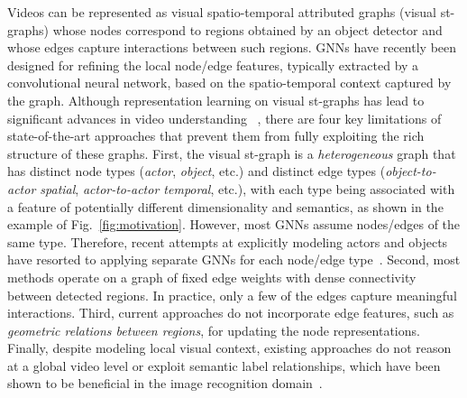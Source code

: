 \documentclass[runningheads]{llncs}
\begin{document}
Videos can be represented as visual spatio-temporal attributed graphs (visual 
st-graphs) whose nodes correspond to regions obtained by an object detector
and whose edges capture interactions between such regions. GNNs have recently 
been designed for refining the local node/edge features, typically extracted 
by a convolutional neural network, based on the spatio-temporal context 
captured by the graph. Although representation learning on visual st-graphs 
has lead to significant advances in video understanding~
\cite{Zhang:CVPR19,Sun:ECCV18,Girdhar:CVPR19,Wang:ECCV18,Huang:BMVC19,Yuan:ICCV17,Baradel:ECCV18}, 
there are four key limitations of state-of-the-art approaches that prevent 
them from fully exploiting the rich structure of these graphs.
First, the visual st-graph is a \emph{heterogeneous} graph that has 
distinct node types (\emph{actor}, \emph{object}, etc.) and distinct edge types (\emph{object-to-actor spatial}, \emph{actor-to-actor temporal}, etc.), with each type being 
associated with a feature of potentially different dimensionality and 
semantics, as shown in the example of Fig.~\ref{fig:motivation}. However, most GNNs assume nodes/edges of the same type. Therefore, recent attempts at explicitly modeling actors and objects 
have resorted to applying separate GNNs for each node/edge type~\cite{Zhang:CVPR19,Ghosh:WACV20}.
Second, most methods operate on a graph of fixed edge weights with dense 
connectivity between detected regions. 
In practice, only a few of the edges capture meaningful interactions. 
Third, current approaches do not incorporate edge features, such as \emph{geometric relations between regions}, for updating the 
node representations. Finally, despite modeling local visual context, 
existing approaches do not reason at a global video level or exploit semantic label relationships, which have been shown to be 
beneficial in the image recognition domain~\cite{Liang:NIPS18,Chen:CVPR18}.
\end{document}
